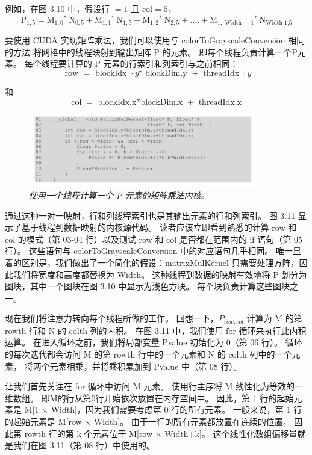 例如，在图 3.10 中，假设行 $=1$ 且 $\mathrm{col}=5$，
$$
\mathrm{P}_{1,5}=\mathrm{M}_{1,0}{ }^{*} \mathrm{~N}_{0,5}+\mathrm{M}_{1,1}{ }^{*} \mathrm{~N}_{1,5}+\mathrm{M}_{1,2}{ }^{*} \mathrm{~N}_{2,5}+\ldots .+\mathrm{M}_{1, \text { Width }-1}{ }^{*} \mathrm{~N}_{\text {Width-1,5}}
$$

要使用 CUDA 实现矩阵乘法，我们可以使用与 colorToGrayscaleConversion 相同的方法
将网格中的线程映射到输出矩阵 P 的元素。 即每个线程负责计算一个P元素。 
每个线程要计算的 P 元素的行索引和列索引与之前相同：
$$
\text { row }=\text { blockIdx } \cdot y^{\star} \text { blockDim.y }+ \text { threadIdx } \cdot y
$$

和
$$
\operatorname{col}=\text { blockIdx.x*blockDim.x }+ \text { threadIdx.x }
$$

\begin{figure}[H]
	\centering
	\includegraphics[width=0.9\textwidth]{figs/F3.11.png}
	\caption{\textit{使用一个线程计算一个 P 元素的矩阵乘法内核。}}
\end{figure}

通过这种一对一映射，行和列线程索引也是其输出元素的行和列索引。 图 3.11 显示了基于线程到数据映射的内核源代码。 
读者应该立即看到熟悉的计算 row 和 col 的模式（第 03-04 行）以及测试 row 和 col 是否都在范围内的 if 语句（第 05 行）。 
这些语句与 colorToGrayscaleConversion 中的对应语句几乎相同。 
唯一显着的区别是，我们做出了一个简化的假设：matrixMulKernel 只需要处理方阵，因此我们将宽度和高度都替换为 Width。 
这种线程到数据的映射有效地将 P 划分为图块，其中一个图块在图 3.10 中显示为浅色方块。 每个块负责计算这些图块之一。

现在我们将注意力转向每个线程所做的工作。 回想一下，$P_{row,col}$ 计算为 M 的第 rowth 行和 N 的 colth 列的内积。
在图 3.11 中，我们使用 for 循环来执行此内积运算。 在进入循环之前，我们将局部变量 Pvalue 初始化为 0（第 06 行）。 
循环的每次迭代都会访问 M 的第 rowth 行中的一个元素和 N 的 colth 列中的一个元素，
将两个元素相乘，并将乘积累加到 Pvalue 中（第 08 行）。

让我们首先关注在 for 循环中访问 M 元素。 使用行主序将 M 线性化为等效的一维数组。 
即M的行从第0行开始依次放置在内存空间中。 因此，第 1 行的起始元素是 M[1 $\times$ Width]，因为我们需要考虑第 0 行的所有元素。
一般来说，第 1 行的起始元素是 M[row $\times$ Width]。 由于一行的所有元素都放置在连续的位置，
因此第 rowth 行的第 k 个元素位于 M[row $\times$ Width+k]。 这个线性化数组偏移量就是我们在图 3.11（第 08 行）中使用的。

